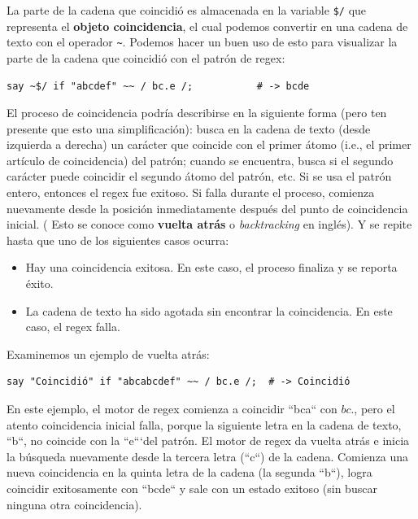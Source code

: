 La parte de la cadena que coincidió es almacenada en la variable
\verb|$/| que representa el {\bf objeto coincidencia}, el cual
podemos convertir en una cadena de texto con el operador \verb|~|.
Podemos hacer un buen uso de esto para visualizar la parte de la
cadena que coincidió con el patrón de regex:

\begin{verbatim}
say ~$/ if "abcdef" ~~ / bc.e /;           # -> bcde
\end{verbatim}
%



El proceso de coincidencia podría describirse en la siguiente
forma (pero ten presente que esto una simplificación): busca en 
la cadena de texto (desde izquierda a derecha) un carácter que 
coincide con el primer átomo (i.e., el primer artículo de 
coincidencia) del patrón; cuando se encuentra, busca si el segundo
carácter puede coincidir el segundo átomo del patrón, etc. Si
se usa el patrón entero, entonces el regex fue exitoso. Si falla
durante el proceso, comienza nuevamente desde la posición 
inmediatamente después del punto de coincidencia inicial. (
Esto se conoce como {\bf vuelta atrás} o \emph{backtracking} en inglés).
Y se repite hasta que uno de los siguientes casos ocurra:

\begin{itemize}
\item Hay una coincidencia exitosa. En este caso, el proceso
finaliza y se reporta éxito. 
\item La cadena de texto ha sido agotada sin encontrar la 
coincidencia. En este caso, el regex falla.
\end{itemize}

Examinemos un ejemplo de vuelta atrás:
\begin{verbatim}
say "Coincidió" if "abcabcdef" ~~ / bc.e /;  # -> Coincidió
\end{verbatim}
%

En este ejemplo, el motor de regex comienza a coincidir 
``bca`` con $bc.$, pero el atento coincidencia inicial falla,
porque la siguiente letra en la cadena de texto, ``b``, no
coincide con la ``e```del patrón. El motor de regex da vuelta
atrás e inicia la búsqueda nuevamente desde la tercera letra (``c``)
de la cadena. Comienza una nueva coincidencia en la quinta letra de
la cadena (la segunda ``b``), logra coincidir exitosamente con
``bcde`` y sale con un estado exitoso (sin buscar ninguna otra
coincidencia).

